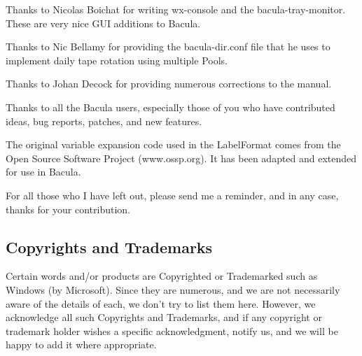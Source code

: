 Thanks to Nicolas Boichat for writing wx-console and the bacula-tray-monitor.
These are very nice GUI additions to Bacula. 

Thanks to Nic Bellamy for providing the bacula-dir.conf file that he uses to
implement daily tape rotation using multiple Pools. 

Thanks to Johan Decock for providing numerous corrections to the manual. 

Thanks to all the Bacula users, especially those of you who have contributed
ideas, bug reports, patches, and new features. 

The original variable expansion code used in the LabelFormat comes from the
Open Source Software Project (www.ossp.org). It has been adapted and extended
for use in Bacula. 

For all those who I have left out, please send me a reminder, and in any case,
thanks for your contribution. 

\subsection*{Copyrights and Trademarks}

Certain words and/or products are Copyrighted or Trademarked such as Windows
(by Microsoft). Since they are numerous, and we are not necessarily aware of
the details of each, we don't try to list them here. However, we acknowledge
all such Copyrights and Trademarks, and if any copyright or trademark holder
wishes a specific acknowledgment, notify us, and we will be happy to add it
where appropriate. 
